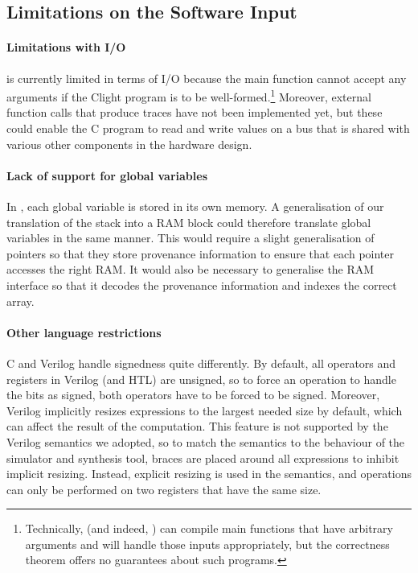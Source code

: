 \subsection{Limitations on the Software Input}


\paragraph{Limitations with I/O}

\vericert{} is currently limited in terms of I/O because the main function cannot accept any arguments if the Clight program is to be well-formed.\footnote{Technically, \vericert{} (and indeed, \compcert{}) can compile main functions that have arbitrary arguments and will handle those inputs appropriately, but the correctness theorem offers no guarantees about such programs.} Moreover, external function calls that produce traces have not been implemented yet, but these could enable the C program to read and write values on a bus that is shared with various other components in the hardware design.

\paragraph{Lack of support for global variables}
In \compcert{}, each global variable is stored in its own memory.  A generalisation of our translation of the stack into a RAM block could therefore translate global variables in the same manner.  This would require a slight generalisation of pointers so that they store provenance information to ensure that each pointer accesses the right RAM. It would also be necessary to generalise the RAM interface so that it decodes the provenance information and indexes the correct array.

\paragraph{Other language restrictions}
C and Verilog handle signedness quite differently. By default, all operators and registers in Verilog (and HTL) are unsigned, so to force an operation to handle the bits as signed, both operators have to be forced to be signed. Moreover, Verilog implicitly resizes expressions to the largest needed size by default, which can affect the result of the computation.  This feature is not supported by the Verilog semantics we adopted, so to match the semantics to the behaviour of the simulator and synthesis tool, braces are placed around all expressions to inhibit implicit resizing.  Instead, explicit resizing is used in the semantics, and operations can only be performed on two registers that have the same size.

